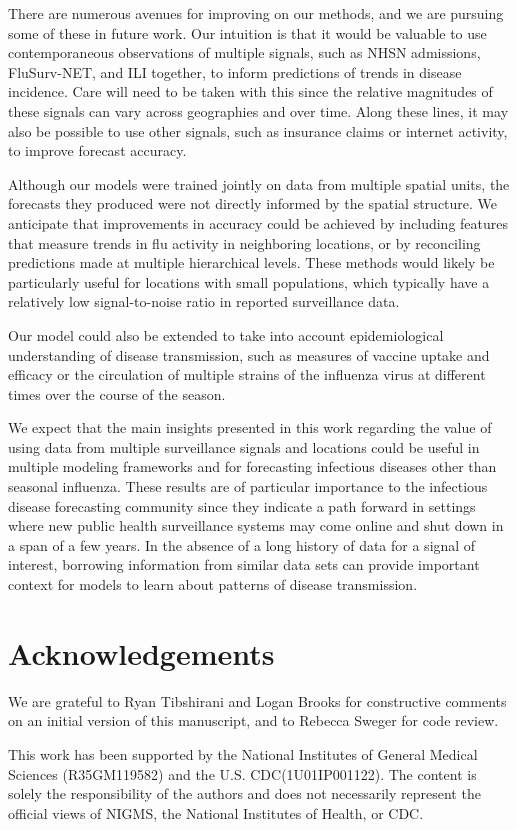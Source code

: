 \documentclass{article}\usepackage[]{graphicx}\usepackage[]{xcolor}
\begin{document}
There are numerous avenues for improving on our methods, and we are pursuing some of these in future work. Our intuition is that it would be valuable to use contemporaneous observations of multiple signals, such as NHSN admissions, FluSurv-NET, and ILI together, to inform predictions of trends in disease incidence. Care will need to be taken with this since the relative magnitudes of these signals can vary across geographies and over time. Along these lines, it may also be possible to use other signals, such as insurance claims or internet activity, to improve forecast accuracy.

Although our models were trained jointly on data from multiple spatial units, the forecasts they produced were not directly informed by the spatial structure. We anticipate that improvements in accuracy could be achieved by including features that measure trends in flu activity in neighboring locations, or by reconciling predictions made at multiple hierarchical levels. These methods would likely be particularly useful for locations with small populations, which typically have a relatively low signal-to-noise ratio in reported surveillance data.

Our model could also be extended to take into account epidemiological understanding of disease transmission, such as measures of vaccine uptake and efficacy or the circulation of multiple strains of the influenza virus at different times over the course of the season.

We expect that the main insights presented in this work regarding the value of using data from multiple surveillance signals and locations could be useful in multiple modeling frameworks and for forecasting infectious diseases other than seasonal influenza. These results are of particular importance to the infectious disease forecasting community since they indicate a path forward in settings where new public health surveillance systems may come online and shut down in a span of a few years. In the absence of a long history of data for a signal of interest, borrowing information from similar data sets can provide important context for models to learn about patterns of disease transmission.

\section*{Acknowledgements}

We are grateful to Ryan Tibshirani and Logan Brooks for constructive comments on an initial version of this manuscript, and to Rebecca Sweger for code review.

This work has been supported by the National Institutes of General Medical Sciences (R35GM119582) and the U.S. CDC(1U01IP001122). The content is solely the responsibility of the authors and does not necessarily represent the official views of NIGMS, the National Institutes of Health, or CDC.

\printbibliography
\end{document}
